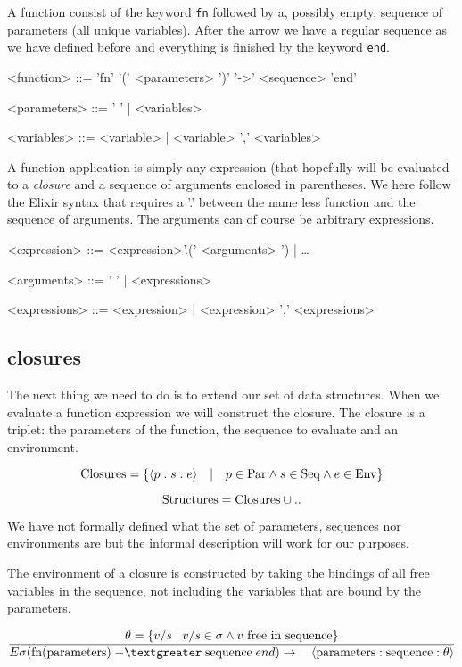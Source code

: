 \documentclass[a4paper,11pt]{article}
\begin{document}
A function consist of the keyword {\tt fn} followed by a, possibly
empty, sequence of parameters (all unique variables). After the arrow
we have a regular sequence as we have defined before and everything is
finished by the keyword {\tt end}.

\begin{grammar}
<function> ::= 'fn' '(' <parameters> ')' '-\textgreater' <sequence> 'end'

<parameters> ::= ' ' | <variables> 

<variables> ::= <variable> |  <variable> ',' <variables>
\end{grammar}

A function application is simply any expression (that hopefully will
be evaluated to a {\em closure} and a sequence of arguments enclosed
in parentheses. We here follow the Elixir syntax that requires a
'.' between the name less function and the sequence of arguments.
The arguments can of course be arbitrary expressions.

\begin{grammar}
<expression> ::=  <expression>'.(' <arguments> ') | \ldots 

<arguments> ::= '  ' | <expressions> 

<expressions> ::= <expression> | <expression> ',' <expressions>
\end{grammar}

\subsection{closures}

The next thing we need to do is to extend our set of data
structures. When we evaluate a function expression we will construct
the closure. The closure is a triplet: the parameters of the function,
the sequence to evaluate and an environment.

$${\rm Closures} = \{\langle p:s:e \rangle \quad | \quad p \in {\rm Par} \wedge s \in {\rm Seq} \wedge e \in {\rm Env}\}$$

$${\rm Structures} = {\rm Closures} \cup ..$$

We have not formally defined what the set of parameters, sequences nor
environments are but the informal description will work for our
purposes.

The environment of a closure is constructed by taking the bindings of
all free variables in the sequence, not including the variables that
are bound by the parameters.

$$\frac{ \theta = \{ v/s \mid  v/s \in \sigma \wedge v {\rm\ free\  in\ sequence}\}}{
E\sigma({\rm fn}({\rm parameters})\; {\rm -\textgreater}\; {\rm sequence}\; end )\rightarrow \quad \langle{\rm parameters}:{\rm sequence}:\theta\rangle}$$
\end{document}
